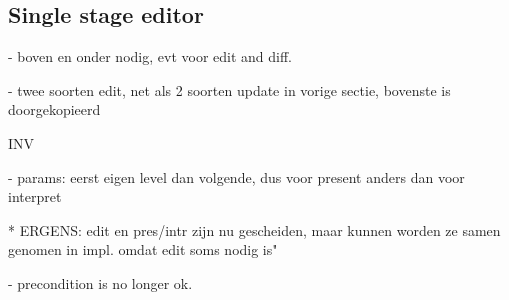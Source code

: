 %																
\subsection{Single stage editor}





\begin{scriptsize}
\bigskip \noindent
{}
\end{scriptsize}
 
\begin{scriptsize}
\bigskip \noindent
{}
\end{scriptsize}



- boven en onder nodig, evt voor edit and diff. 


- twee soorten edit, net als 2 soorten update in vorige sectie, bovenste is doorgekopieerd

INV

- params: eerst eigen level dan volgende, dus voor present anders dan voor interpret

* ERGENS: edit en pres/intr zijn nu gescheiden, maar kunnen worden ze samen genomen in impl. omdat edit soms nodig is"

- precondition is no longer ok.

